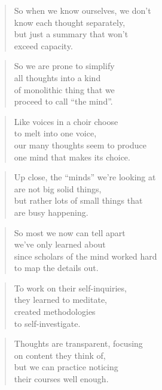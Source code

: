 \documentclass[10pt,a4paper]{article}
\begin{document}
\begin{multicols}{2}
\begin{verse}
So when we know ourselves, we don’t\\
know each thought separately,\\
but just a summary that won’t\\
exceed capacity.
\end{verse}

\begin{verse}
So we are prone to simplify\\
all thoughts into a kind\\
of monolithic thing that we\\
proceed to call “the mind”.
\end{verse}

\begin{verse}
Like voices in a choir choose\\
to melt into one voice,\\
our many thoughts seem to produce\\
one mind that makes its choice.
\end{verse}

\begin{verse}
Up close, the “minds” we’re looking at\\
are not big solid things,\\
but rather lots of small things that\\
are busy happening.
\end{verse}

\begin{verse}
So most we now can tell apart\\
we’ve only learned about\\
since scholars of the mind worked hard\\
to map the details out.
\end{verse}

\begin{verse}
To work on their self-inquiries,\\
they learned to meditate,\\
created methodologies\\
to self-investigate.
\end{verse}

\begin{verse}
Thoughts are transparent, focusing\\
on content they think of,\\
but we can practice noticing\\
their courses well enough.
\end{verse}


\end{multicols}
\end{document}
